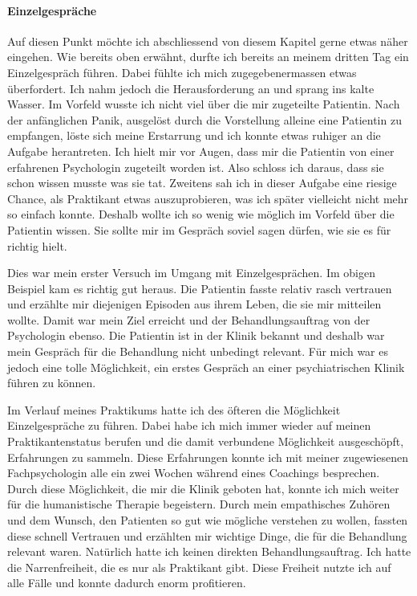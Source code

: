 \paragraph{Einzelgespräche}
Auf diesen Punkt möchte ich abschliessend von diesem Kapitel gerne etwas näher eingehen. Wie bereits oben erwähnt, durfte ich bereits an meinem dritten Tag ein Einzelgespräch führen. Dabei fühlte ich mich zugegebenermassen etwas überfordert. Ich nahm jedoch die Herausforderung an und sprang ins kalte Wasser. Im Vorfeld wusste ich nicht viel über die mir zugeteilte Patientin. Nach der anfänglichen Panik, ausgelöst durch die Vorstellung alleine eine Patientin zu empfangen, löste sich meine Erstarrung und ich konnte etwas ruhiger an die Aufgabe herantreten. Ich hielt mir vor Augen, dass mir die Patientin von einer erfahrenen Psychologin zugeteilt worden ist. Also schloss ich daraus, dass sie schon wissen musste was sie tat. Zweitens sah ich in dieser Aufgabe eine riesige Chance, als Praktikant etwas auszuprobieren, was ich später vielleicht nicht mehr so einfach konnte. Deshalb wollte ich so wenig wie möglich im Vorfeld über die Patientin wissen. Sie sollte mir im Gespräch soviel sagen dürfen, wie sie es für richtig hielt. 

Dies war mein erster Versuch im Umgang mit Einzelgesprächen. Im obigen Beispiel kam es richtig gut heraus. Die Patientin fasste relativ rasch vertrauen und erzählte mir diejenigen Episoden aus ihrem Leben, die sie mir mitteilen wollte. Damit war mein Ziel erreicht und der Behandlungsauftrag von der Psychologin ebenso. Die Patientin ist in der Klinik bekannt und deshalb war mein Gespräch für die Behandlung nicht unbedingt relevant. Für mich war es jedoch eine tolle Möglichkeit, ein erstes Gespräch an einer psychiatrischen Klinik führen zu können.

Im Verlauf meines Praktikums hatte ich des öfteren die Möglichkeit Einzelgespräche zu führen. Dabei habe ich mich immer wieder auf meinen Praktikantenstatus berufen und die damit verbundene Möglichkeit ausgeschöpft, Erfahrungen zu sammeln. Diese Erfahrungen konnte ich mit meiner zugewiesenen Fachpsychologin alle ein zwei Wochen während eines Coachings besprechen. Durch diese Möglichkeit, die mir die Klinik geboten hat, konnte ich mich weiter für die humanistische Therapie begeistern. Durch mein empathisches Zuhören und dem Wunsch, den Patienten so gut wie mögliche verstehen zu wollen, fassten diese schnell Vertrauen und erzählten mir wichtige Dinge, die für die Behandlung relevant waren. Natürlich hatte ich keinen direkten Behandlungsauftrag. Ich hatte die Narrenfreiheit, die es nur als Praktikant gibt. Diese Freiheit nutzte ich auf alle Fälle und konnte dadurch enorm profitieren.


